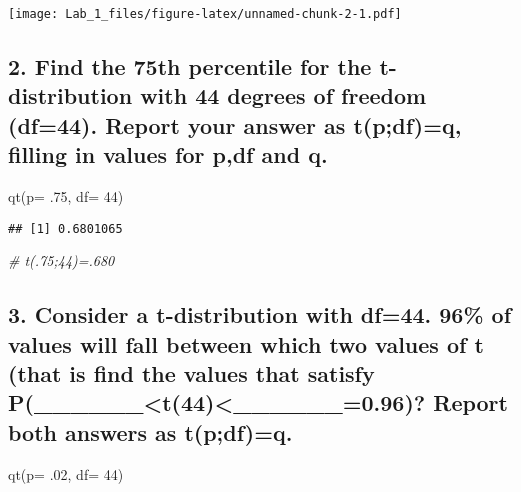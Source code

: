 \documentclass[
]{article}
\newenvironment{Shaded}{\begin{snugshade}}{\end{snugshade}}
\newcommand{\AttributeTok}[1]{\textcolor[rgb]{0.77,0.63,0.00}{#1}}
\newcommand{\CommentTok}[1]{\textcolor[rgb]{0.56,0.35,0.01}{\textit{#1}}}
\newcommand{\DecValTok}[1]{\textcolor[rgb]{0.00,0.00,0.81}{#1}}
\newcommand{\FunctionTok}[1]{\textcolor[rgb]{0.00,0.00,0.00}{#1}}
\newcommand{\NormalTok}[1]{#1}
\begin{document}
\texttt{[image: Lab\_1\_files/figure-latex/unnamed-chunk-2-1.pdf]}

\hypertarget{find-the-75th-percentile-for-the-t-distribution-with-44-degrees-of-freedom-df44.-report-your-answer-as-tpdfq-filling-in-values-for-pdf-and-q.}{%
\subsection{2. Find the 75th percentile for the t-distribution with 44
degrees of freedom (df=44). Report your answer as t(p;df)=q, filling in
values for p,df and
q.}\label{find-the-75th-percentile-for-the-t-distribution-with-44-degrees-of-freedom-df44.-report-your-answer-as-tpdfq-filling-in-values-for-pdf-and-q.}}

\begin{Shaded}
\begin{Highlighting}[]
\FunctionTok{qt}\NormalTok{(}\AttributeTok{p=}\NormalTok{ .}\DecValTok{75}\NormalTok{, }\AttributeTok{df=} \DecValTok{44}\NormalTok{)}
\end{Highlighting}
\end{Shaded}

\begin{verbatim}
## [1] 0.6801065
\end{verbatim}

\begin{Shaded}
\begin{Highlighting}[]
\CommentTok{\# t(.75;44)=.680}
\end{Highlighting}
\end{Shaded}

\hypertarget{consider-a-t-distribution-with-df44.-96-of-values-will-fall-between-which-two-values-of-t-that-is-find-the-values-that-satisfy-p______t44______0.96-report-both-answers-as-tpdfq.}{%
\subsection{3. Consider a t-distribution with df=44. 96\% of values will
fall between which two values of t (that is find the values that satisfy
P(\_\_\_\_\_\_\textless t(44)\textless\_\_\_\_\_\_=0.96)? Report both
answers as
t(p;df)=q.}\label{consider-a-t-distribution-with-df44.-96-of-values-will-fall-between-which-two-values-of-t-that-is-find-the-values-that-satisfy-p______t44______0.96-report-both-answers-as-tpdfq.}}

\begin{Shaded}
\begin{Highlighting}[]
\FunctionTok{qt}\NormalTok{(}\AttributeTok{p=}\NormalTok{ .}\DecValTok{02}\NormalTok{, }\AttributeTok{df=} \DecValTok{44}\NormalTok{)}
\end{Highlighting}
\end{Shaded}
\end{document}
